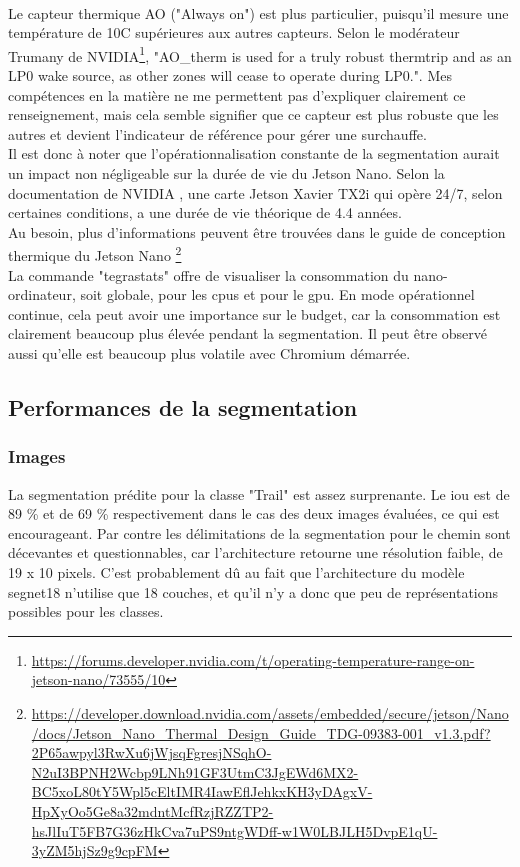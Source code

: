 \vspace{0.5\baselineskip}
\\
\noindent Le capteur thermique AO ("Always on") est plus particulier, puisqu'il mesure une température de 10C supérieures aux autres capteurs. Selon le modérateur Trumany de NVIDIA\footnote{\url{https://forums.developer.nvidia.com/t/operating-temperature-range-on-jetson-nano/73555/10}}, "AO\_therm is used for a truly robust thermtrip and as an LP0 wake source, as other zones will cease to operate during LP0.". Mes compétences en la matière ne me permettent pas d'expliquer clairement ce renseignement, mais cela semble signifier que ce capteur est plus robuste que les autres et devient l'indicateur de référence pour gérer une surchauffe. 
\vspace{0.5\baselineskip}
\\
\noindent Il est donc à noter que l'opérationnalisation constante de la segmentation aurait un impact non négligeable sur la durée de vie du Jetson Nano. Selon la documentation de NVIDIA \parencite{nvidia_nvidia_2020}, une carte Jetson Xavier TX2i qui opère 24/7, selon certaines conditions, a une durée de vie théorique de 4.4 années.
\vspace{0.5\baselineskip}
\\
\noindent Au besoin, plus d'informations peuvent être trouvées dans le guide de conception thermique du Jetson Nano \footnote{\url{https://developer.download.nvidia.com/assets/embedded/secure/jetson/Nano/docs/Jetson_Nano_Thermal_Design_Guide_TDG-09383-001_v1.3.pdf?2P65awpyl3RwXu6jWjsqFgresjNSqhO-N2uI3BPNH2Wcbp9LNh91GF3UtmC3JgEWd6MX2-BC5xoL80tY5Wpl5cEltIMR4IawEflJehkxKH3yDAgxV-HpXyOo5Ge8a32mdntMcfRzjRZZTP2-hsJlIuT5FB7G36zHkCva7uPS9ntgWDff-w1W0LBJLH5DvpE1qU-3yZM5hjSz9g9cpFM}}
\vspace{0.5\baselineskip}
\\
\noindent La commande "tegrastats" offre de visualiser la consommation du nano-ordinateur, soit globale, pour les \acrshort{cpu}s et pour le \acrshort{gpu}. En mode opérationnel continue, cela peut avoir une importance sur le budget, car la consommation est clairement beaucoup plus élevée pendant la segmentation. Il peut être observé aussi qu'elle est beaucoup plus volatile avec Chromium démarrée. 
\subsection{Performances de la segmentation}
\subsubsection{Images}
La segmentation prédite pour la classe "Trail" est assez surprenante. Le \acrshort{iou} est de 89 \% et de 69 \% respectivement dans le cas des deux images évaluées, ce qui est encourageant. Par contre les délimitations de la segmentation pour le chemin sont décevantes et questionnables, car l'architecture retourne une résolution faible, de 19 x 10 pixels. C'est probablement dû au fait que l'architecture du modèle segnet18 n'utilise que 18 couches, et qu'il n'y a donc que peu de représentations possibles pour les classes. 

